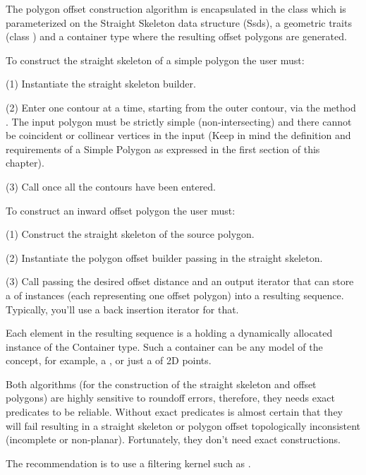 The polygon offset construction algorithm is encapsulated in the class
 which is
parameterized on the Straight Skeleton data structure (Ssds), a
geometric traits (class )
and a container type where the resulting offset polygons are
generated.

To construct the straight skeleton of a simple polygon the user must:
 
(1) Instantiate the straight skeleton builder.

(2) Enter one contour at a time, starting from the outer contour, via
    the method . The input polygon must be strictly
    simple (non-intersecting) and there cannot be coincident or
    collinear vertices in the input (Keep in mind the definition and
    requirements of a Simple Polygon as expressed in the first section
    of this chapter).

(3) Call  once all the contours have been entered.


To construct an inward offset polygon the user must:
 
(1) Construct the straight skeleton of the source polygon.

(2) Instantiate the polygon offset builder passing in the straight skeleton.

(3) Call  passing the desired offset
    distance and an output iterator that can store a
     of  instances (each
    representing one offset polygon) into a resulting
    sequence. Typically, you'll use a back insertion iterator for
    that.

Each element in the resulting sequence is a 
holding a dynamically allocated instance of the Container type. Such a
container can be any model of the  concept, for
example, a , or just a  of 2D
points.

Both algorithms (for the construction of the straight skeleton and
offset polygons) are highly sensitive to roundoff errors, therefore,
they needs exact predicates to be reliable. Without exact predicates
is almost certain that they will fail resulting in a straight skeleton
or polygon offset topologically inconsistent (incomplete or
non-planar). Fortunately, they don't need exact constructions.

The recommendation is to use a filtering kernel such as
.


